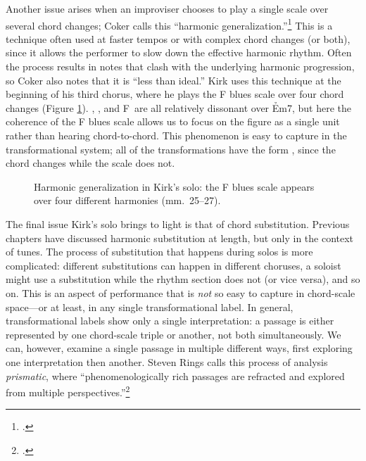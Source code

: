 Another issue arises when an improviser chooses to play a single scale over
several chord changes; Coker calls this ``harmonic
generalization.''\footcite[45--49]{coker:elements} This is a technique often
used at faster tempos or with complex chord changes (or both), since it allows
the performer to slow down the effective harmonic rhythm. Often the process
results in notes that clash with the underlying harmonic progression, so Coker
also notes that it is ``less than ideal.'' Kirk uses this technique
at the beginning of his third chorus, where he plays the F blues scale over
four chord changes (Figure \ref{csa:harmonic-generalization}).
\Bflat, \Aflat, and F\nat\ are all relatively dissonant over \h{Em7}, but here
the coherence of the F blues scale allows us to focus on the figure as a
single unit rather than hearing chord-to-chord. This phenomenon is easy to
capture in the transformational system; all of the transformations have the
form , since the chord changes while the scale does not.

\begin{figure}[tbp]
  \caption[Harmonic generalization in Kirk's solo.]{Harmonic generalization in
    Kirk's solo: the F blues scale appears over four different harmonies
    (mm.~25--27).}
  \label{csa:harmonic-generalization}
\end{figure}

The final issue Kirk's solo brings to light is that of chord substitution.
Previous chapters have discussed harmonic substitution at length, but only in
the context of tunes. The process of substitution that happens during solos is
more complicated: different substitutions can happen in different choruses, a
soloist might use a substitution while the rhythm section does not (or vice
versa), and so on. This is an aspect of performance that is \emph{not} so easy
to capture in chord-scale space---or at least, in any single transformational
label. In general, transformational labels show only a single
interpretation: a passage is either represented by one chord-scale triple or
another, not both simultaneously. We can, however, examine a single passage in
multiple different ways, first exploring one interpretation then another.
Steven Rings calls this process of analysis \emph{prismatic}, where
``phenomenologically rich passages are refracted and explored from multiple
perspectives.''\footcite[38]{rings:2011}

